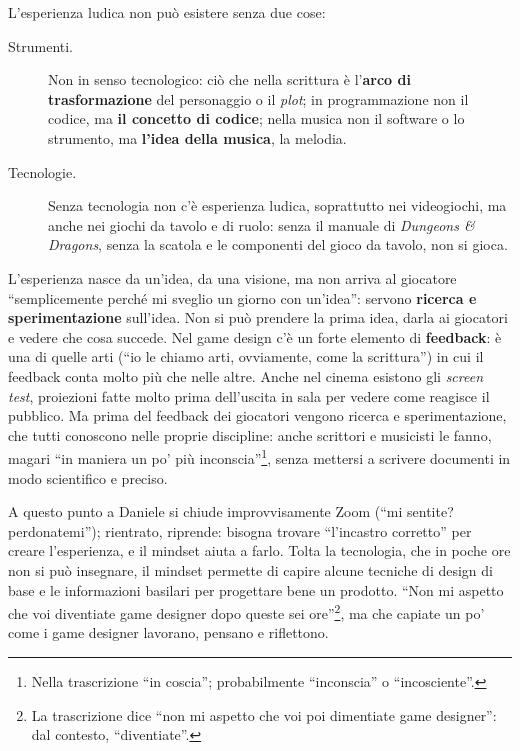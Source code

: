 L'esperienza ludica non può esistere senza due cose:
\begin{description}
  \item[Strumenti.] Non in senso tecnologico: ciò che nella scrittura è
        l'\textbf{arco di trasformazione} del personaggio o il \emph{plot}; in
        programmazione non il codice, ma \textbf{il concetto di codice}; nella
        musica non il software o lo strumento, ma \textbf{l'idea della musica},
        la melodia.
  \item[Tecnologie.] Senza tecnologia non c'è esperienza ludica, soprattutto
        nei videogiochi, ma anche nei giochi da tavolo e di ruolo: senza il
        manuale di \emph{Dungeons \& Dragons}, senza la scatola e le componenti
        del gioco da tavolo, non si gioca.
\end{description}
L'esperienza nasce da un'idea, da una visione, ma non arriva al giocatore
``semplicemente perché mi sveglio un giorno con un'idea'': servono
\textbf{ricerca e sperimentazione} sull'idea. Non si può prendere la prima
idea, darla ai giocatori e vedere che cosa succede. Nel game design c'è un forte
elemento di \textbf{feedback}: è una di quelle arti (``io le chiamo arti,
ovviamente, come la scrittura'') in cui il feedback conta molto più che nelle
altre. Anche nel cinema esistono gli \emph{screen test}, proiezioni fatte molto
prima dell'uscita in sala per vedere come reagisce il pubblico. Ma prima del
feedback dei giocatori vengono ricerca e sperimentazione, che tutti conoscono
nelle proprie discipline: anche scrittori e musicisti le fanno, magari ``in
maniera un po' più inconscia''\footnote{Nella trascrizione ``in coscia'';
probabilmente ``inconscia'' o ``incosciente''.}, senza mettersi a scrivere
documenti in modo scientifico e preciso.

A questo punto a Daniele si chiude improvvisamente Zoom (``mi sentite?
perdonatemi''); rientrato, riprende: bisogna trovare ``l'incastro corretto'' per
creare l'esperienza, e il mindset aiuta a farlo. Tolta la tecnologia, che in
poche ore non si può insegnare, il mindset permette di capire alcune tecniche di
design di base e le informazioni basilari per progettare bene un prodotto. ``Non
mi aspetto che voi diventiate game designer dopo queste sei
ore''\footnote{La trascrizione dice ``non mi aspetto che voi poi dimentiate
game designer'': dal contesto, ``diventiate''.}, ma che capiate un po' come i
game designer lavorano, pensano e riflettono.

